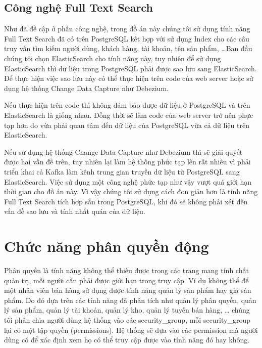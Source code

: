 \subsection{Công nghệ Full Text Search}
Như đã đề cập ở phần công nghệ, trong đồ án này chúng tôi sử
dụng tính năng Full Text Search đã có trên PostgreSQL kết hợp
với sử dụng Index cho các câu truy vấn tìm kiếm người dùng,
khách hàng, tài khoản, tên sản phẩm, \ldots Ban đầu chúng tôi
chọn ElasticSearch cho tính năng này, tuy nhiên để sử dụng
ElasticSearch thì dữ liệu trong PostgreSQL phải được sao lưu
sang ElasticSearch. Để thực hiện việc sao lưu này có thể thực
hiện trên code của web server hoặc sử dụng hệ thống
Change Data Capture như Debezium.

Nếu thực hiện trên code thì không đảm bảo được dữ liệu
ở PostgreSQL và trên ElasticSearch là giống nhau. Đồng thời
sẽ làm code của web server trở nên phực tạp hơn do vừa phải quan
tâm đến dữ liệu của PostgreSQL vừa cả dữ liệu trên ElasticSearch.

Nếu sử dụng hệ thống Change Data Capture như Debezium
thì sẽ giải quyết được hai vấn đề trên, tuy nhiên lại làm hệ thống
phức tạp lên rất nhiều vì phải triển khai cả Kafka làm
kênh trung gian truyền dữ liệu từ PostgreSQL sang ElasticSearch.
Việc sử dụng một công nghệ phức tạp như vậy vượt quá giới
hạn thời gian cho đồ án này. Vì vậy chúng tôi sử dụng cách đơn giản
hơn là tính năng Full Text Search tích hợp sẵn trong PostgreSQL,
khi đó sẽ không phải xét đến vấn đề sao
lưu và tính nhất quán của dữ liệu.

\section{Chức năng phân quyền động}
Phân quyền là tính năng không thể thiếu được trong các trang mang
tính chất quản trị, mỗi người cần phải được giới hạn trong truy cập.
Ví dụ không thể để một nhân viên bán hàng sử dụng được tính năng
quản lý sản phẩm hay giá sản phẩm. Do đó dựa trên các tính năng
đã phân tích như quản lý phân quyền, quản lý sản phẩm, quản lý tài khoản,
quản lý kho, quản lý tuyến bán hàng, … chúng tôi phân chia người dùng
hệ thống vào các security\_group, mỗi security\_group lại có một tập
quyền (permissions). Hệ thống sẽ dựa vào các permission mà người
dùng có để xác định xem họ có thể truy
cập được vào tính năng đó hay không.

